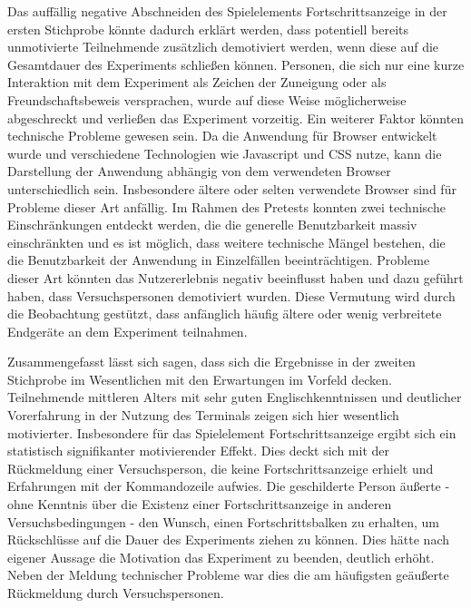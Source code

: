 Das auffällig negative Abschneiden des Spielelements Fortschrittsanzeige in der ersten Stichprobe könnte dadurch erklärt werden, dass potentiell bereits unmotivierte Teilnehmende zusätzlich demotiviert werden, wenn diese auf die Gesamtdauer des Experiments schließen können. Personen, die sich nur eine kurze Interaktion mit dem Experiment als Zeichen der Zuneigung oder als Freundschaftsbeweis versprachen, wurde auf diese Weise möglicherweise abgeschreckt und verließen das Experiment vorzeitig. Ein weiterer Faktor könnten technische Probleme gewesen sein. Da die Anwendung für Browser entwickelt wurde und verschiedene Technologien wie Javascript und CSS nutze, kann die Darstellung der Anwendung abhängig von dem verwendeten Browser unterschiedlich sein. Insbesondere ältere oder selten verwendete Browser sind für Probleme dieser Art anfällig. Im Rahmen des Pretests konnten zwei technische Einschränkungen entdeckt werden, die die generelle Benutzbarkeit massiv einschränkten und es ist möglich, dass weitere technische Mängel bestehen, die die Benutzbarkeit der Anwendung in Einzelfällen beeinträchtigen. Probleme dieser Art könnten das Nutzererlebnis negativ beeinflusst haben und dazu geführt haben, dass Versuchspersonen demotiviert wurden. Diese Vermutung wird durch die Beobachtung gestützt, dass anfänglich häufig ältere oder wenig verbreitete Endgeräte an dem Experiment teilnahmen.  

Zusammengefasst lässt sich sagen, dass sich die Ergebnisse in der zweiten Stichprobe im Wesentlichen mit den Erwartungen im Vorfeld decken. Teilnehmende mittleren Alters mit sehr guten Englischkenntnissen und deutlicher Vorerfahrung in der Nutzung des Terminals zeigen sich hier wesentlich motivierter. Insbesondere für das Spielelement Fortschrittsanzeige ergibt sich ein statistisch signifikanter motivierender Effekt. Dies deckt sich mit der Rückmeldung einer Versuchsperson, die keine Fortschrittsanzeige erhielt und Erfahrungen mit der Kommandozeile aufwies. Die geschilderte Person äußerte - ohne Kenntnis über die Existenz einer Fortschrittsanzeige in anderen Versuchsbedingungen - den Wunsch, einen Fortschrittsbalken zu erhalten, um Rückschlüsse auf die Dauer des Experiments ziehen zu können. Dies hätte nach eigener Aussage die Motivation das Experiment zu beenden, deutlich erhöht. Neben der Meldung technischer Probleme war dies die am häufigsten geäußerte Rückmeldung durch Versuchspersonen. 

